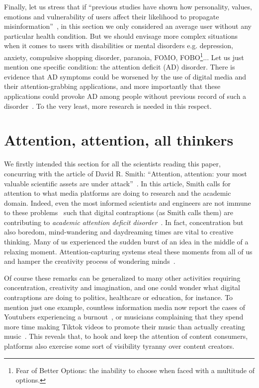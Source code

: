 \documentclass[10pt]{article}
\newcommand*\sepline{%
  \begin{center}
    \rule[1ex]{.17\textwidth}{.5pt}~{\LARGE\ding{104}}~\rule[1ex]{.17\textwidth}{.5pt}
  \end{center}}
\begin{document}
Finally, let us stress that if ``previous studies have shown how personality, values, emotions and vulnerability of users affect their likelihood to propagate misinformation''~\cite{fernandez_analysing_2021}, in this section we only considered an average user without any particular health condition. 
But we should envisage more complex situations when it comes to users with disabilities or mental disorders e.g. depression, anxiety, compulsive shopping disorder, paranoia, FOMO, FOBO\footnote{Fear of Better Options: the inability to choose when faced with a multitude of options. %
}...
Let us just mention one specific condition: the attention deficit (AD) disorder. There is evidence that AD symptoms could be worsened by the use of digital media and their attention-grabbing applications, and more importantly that these applications could provoke AD among people without previous record of such a disorder~\cite{ra_association_2018}. To the very least, more research is needed in this respect.


\section{Attention, attention, all thinkers}\label{sec:scientists}
We firstly intended this section for all the scientists reading this paper, concurring with the article of David R. Smith: ``Attention, attention: your most valuable scientific assets are under attack''~\cite{smith_attention_2018}. In this article, Smith calls for attention to what media platforms are doing to research and the academic domain.
Indeed, even the most informed scientists and engineers are not immune to these problems~\cite{lewis_our_2017} such that digital contraptions (as Smith calls them) are contributing to \textit{academic attention deficit disorder}~\cite{smith_attention_2018}.
In fact, concentration but also boredom, mind-wandering and daydreaming times are vital to creative thinking. Many of us experienced the sudden burst of an idea in the middle of a relaxing moment. Attention-capturing systems %
steal these moments from all of us 
and hamper the creativity process of wondering minds~\cite{zomorodi2017bored}.

Of course these remarks can be generalized to many other activities requiring concentration, creativity and imagination, and one could wonder what digital contraptions are doing to politics, healthcare or education, for instance. 
To mention just one example, countless information media now report the cases of Youtubers experiencing a burnout~\cite{parkin_youtube_2018}, or musicians complaining that they spend more time making Tiktok videos to promote their music than actually creating music~\cite{shah_making_2022,whateley_tiktoks_2023}.
This reveals that, to hook and keep the attention of content consumers, platforms also exercise some sort of visibility tyranny over content creators.
\end{document}
